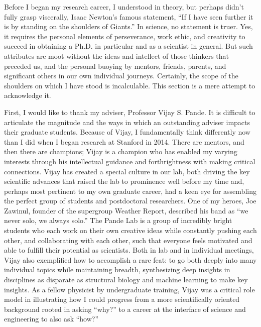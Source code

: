 \begin{acknowledgments}
Before I began my research career, I understood in theory, but perhaps didn’t fully grasp viscerally, Isaac Newton’s famous statement, “If I have seen further it is by standing on the shoulders of Giants.” In science, no statement is truer. Yes, it requires the personal elements of perseverance, work ethic, and creativity to succeed in obtaining a Ph.D. in particular and as a scientist in general. But such attributes are moot without the ideas and intellect of those thinkers that preceded us, and the personal buoying by mentors, friends, parents, and significant others in our own individual journeys. Certainly, the scope of the shoulders on which I have stood is incalculable. This section is a mere attempt to acknowledge it.

First, I would like to thank my adviser, Professor Vijay S. Pande. It is difficult to articulate the magnitude and the ways in which an outstanding adviser impacts their graduate students. Because of Vijay, I fundamentally think differently now than I did when I began research at Stanford in 2014. There are mentors, and then there are champions; Vijay is a champion who has enabled my varying interests through his intellectual guidance and forthrightness with making critical connections. Vijay has created a special culture in our lab, both driving the key scientific advances that raised the lab to prominence well before my time and, perhaps most pertinent to my own graduate career, had a keen eye for assembling the perfect group of students and postdoctoral researchers. One of my heroes, Joe Zawinul, founder of the supergroup Weather Report, described his band as “we never solo, we always solo.” The Pande Lab is a group of incredibly bright students who each work on their own creative ideas while constantly pushing each other, and collaborating with each other, such that everyone feels motivated and able to fulfill their potential as scientists. Both in lab and in individual meetings, Vijay also exemplified how to accomplish a rare feat: to go both deeply into many individual topics while maintaining breadth, synthesizing deep insights in disciplines as disparate as structural biology and machine learning to make key insights. As a fellow physicist by undergraduate training, Vijay was a critical role model in illustrating how I could progress from a more scientifically oriented background rooted in asking “why?” to a career at the interface of science and engineering to also ask “how?”


\end{acknowledgments}
